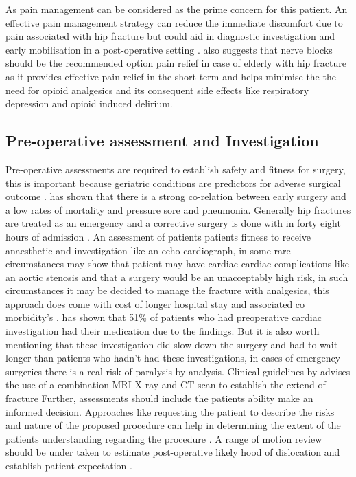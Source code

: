\documentclass[a4paper,man,british]{apa6}
\begin{document}
As pain management can be considered as the prime concern for this patient. An effective pain management strategy can reduce the immediate discomfort due to pain associated with hip fracture but could aid in diagnostic investigation and early mobilisation in a post-operative setting \parencite{fernandez_management_2015,monzon_pain_2010}. \textcite{fernandez_management_2015} also suggests that nerve blocks should be the recommended option pain relief in case of elderly with hip fracture as it provides effective pain relief in the short term and helps minimise the the need for opioid analgesics and its consequent side effects like respiratory depression and opioid induced delirium.

\subsection{Pre-operative assessment and Investigation}

Pre-operative assessments are required to establish safety and fitness for surgery, this is important because geriatric conditions are predictors for adverse surgical outcome \parencite{oresanya_preoperative_2014}. \textcite{simunovic_effect_2010} has shown that there is a strong co-relation between early surgery and a low rates of mortality and pressure sore and pneumonia. Generally hip fractures are treated as an emergency and a corrective surgery is done with in forty eight hours of admission \parencite{siu_preoperative_2010}. An assessment of patients  patients fitness to receive anaesthetic and investigation like an echo cardiograph, in some rare circumstances may show that patient may have cardiac cardiac complications like an aortic stenosis and that a surgery would be an unacceptably high risk, in such circumstances it may be decided to manage the fracture with analgesics, this approach does come with cost of longer hospital stay and associated co morbidity's \parencite{parker_hip_2006,siu_preoperative_2010}. \textcite{oheireamhoin_role_2011} has shown that 51\% of patients who had preoperative cardiac investigation had their medication due to the findings. But it is also worth mentioning that these investigation did slow down the surgery and had to wait longer than patients who hadn't had these investigations, in cases of emergency surgeries there is a real risk of paralysis by analysis. 
Clinical guidelines by \textcite{chesser_new_2011} advises the use of a combination MRI X-ray and CT scan to establish the extend of fracture
\newline
Further, assessments should include the patients ability make an informed decision. Approaches like requesting the patient to describe the risks and nature of the proposed procedure can help in determining the extent of the patients understanding regarding the procedure \parencite{oresanya_preoperative_2014}.
A range of motion review should be under taken to estimate post-operative likely hood of dislocation and establish patient expectation \parencite{krenzel_high_2010}.
\end{document}
